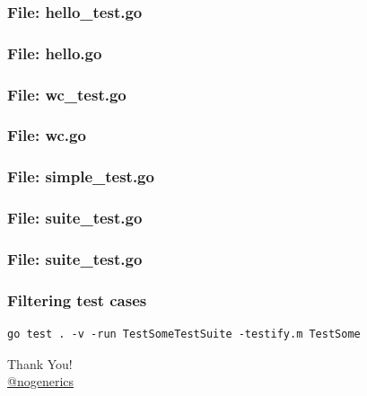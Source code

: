 \documentclass[aspectratio=169]{beamer}
\begin{document}
\begin{frame}[fragile]
  \frametitle{File: hello\_test.go}

  

\end{frame}


\begin{frame}[fragile]
  \frametitle{File: hello.go}

  

\end{frame}


\begin{frame}[fragile]
  \frametitle{File: wc\_test.go}

  

\end{frame}

\begin{frame}[fragile]
  \frametitle{File: wc.go}

  

\end{frame}

\begin{frame}[fragile]
  \frametitle{File: simple\_test.go}

  

\end{frame}

\begin{frame}[fragile]
  \frametitle{File: suite\_test.go}

  

\end{frame}

\begin{frame}[fragile]
  \frametitle{File: suite\_test.go}

  

\end{frame}

\begin{frame}[fragile]
  \frametitle{Filtering test cases}

\begin{verbatim}
go test . -v -run TestSomeTestSuite -testify.m TestSome
\end{verbatim}

\end{frame}

\begin{frame}%
\begin{center}
{\huge Thank You!}\\[1cm]
{\large \href{https://twitter.com/nogenerics}{@nogenerics}}
\end{center}
\end{frame}
\end{document}
